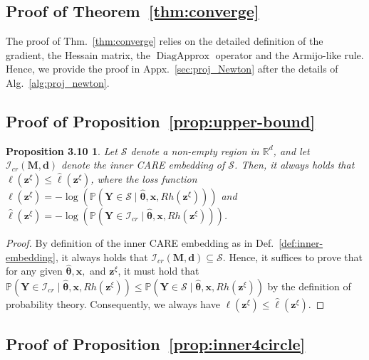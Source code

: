 \documentclass{article}
\theoremstyle{plain}
\newtheorem*{proposition39}{Proposition 3.10}
\theoremstyle{definition}
\def \x {\mathbf{x}}
\def \M {\mathbf{M}}
\def \Y{\mathbf{Y}}
\def \x {\mathbf{x}}
\def \sI {\mathcal{I}}
\def \sS {\mathcal{S}}
\def \Y {\mathbf{Y}}
\def \M {\mathbf{M}}
\def \z {\mathbf{z}}
\def \d {\mathbf{d}}
\begin{document}
\subsection{Proof of Theorem~\ref{thm:converge}}
The proof of Thm.~\ref{thm:converge} relies on the detailed definition of the gradient, the Hessain matrix, the $\operatorname*{DiagApprox}$ operator and the Armijo-like rule. Hence, we provide the proof in Appx.~\ref{sec:proj_Newton} after the details of Alg.~\ref{alg:proj_newton}.


\subsection{Proof of Proposition~\ref{prop:upper-bound}}

\begin{proposition39}
      Let $\sS$ denote a non-empty region in $\mathbb{R}^{d}$, and let $\sI_{cr}\left(\M, \d\right)$ denote the inner CARE embedding of $\sS$. 
      Then, it always holds that \(\ell(\z^\xi)\leq\hat{\ell}(\z^\xi)\), where the loss function $\ell(\z^\xi)=-\log\left(\mathbb{P}(\Y \in \sS\mid \hat{\bm{\theta}}, \x, Rh(\z^\xi))\right)$ and $\hat{\ell}(\z^\xi)=-\log\left(\mathbb{P}(\Y \in \sI_{cr}\mid \hat{\bm{\theta}}, \x, Rh(\z^\xi))\right)$.
\end{proposition39}

\begin{proof}
  \label{proof:upper-bound}
  By definition of the inner CARE embedding as in Def.~\ref{def:inner-embedding}, it always holds that $\sI_{cr}\left(\M, \d\right)\subseteq \sS$. Hence, it suffices to prove that for any given $\hat{\bm{\theta}}, \x,$ and $\z^\xi$, it must hold that $\mathbb{P}(\Y \in \sI_{cr}\mid \hat{\bm{\theta}}, \x, Rh(\z^\xi))\leq \mathbb{P}(\Y \in \sS\mid \hat{\bm{\theta}}, \x, Rh(\z^\xi))$ by the definition of probability theory. Consequently, we always have $\ell(\z^\xi)\leq \hat{\ell}(\z^\xi)$.
\end{proof}

\subsection{Proof of Proposition~\ref{prop:inner4circle}}
\end{document}
